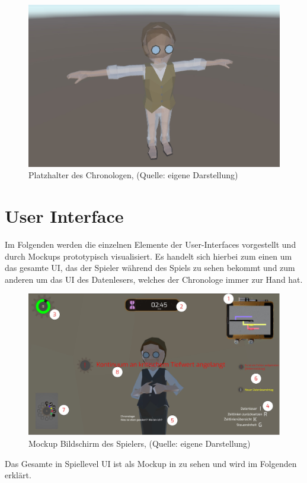 \begin{figure}[ht]
\centering
\includegraphics[width=0.8\linewidth]{content/pictures/Ghost.jpg}
\caption{Platzhalter des Chronologen, (Quelle: eigene Darstellung)}
\label{fig:ghost}
\end{figure}
\newpage
\section{User Interface}\label{sec:user-interface}
Im Folgenden werden die einzelnen Elemente der User-Interfaces vorgestellt und durch Mockups prototypisch visualisiert. Es handelt sich hierbei zum einen um das gesamte \ac{UI}, das der Spieler während des Spiels zu sehen bekommt und zum anderen um das \ac{UI} des Datenlesers, welches der Chronologe immer zur Hand hat.

\begin{figure}[ht]
\centering
\includegraphics[width=1\linewidth]{content/pictures/UI.jpg}
\caption{Mockup Bildschirm des Spielers, (Quelle: eigene Darstellung)}
\label{fig:ui-player}
\end{figure}

Das Gesamte in Spiellevel \ac{UI} ist als Mockup in  zu sehen und wird im Folgenden erklärt.

